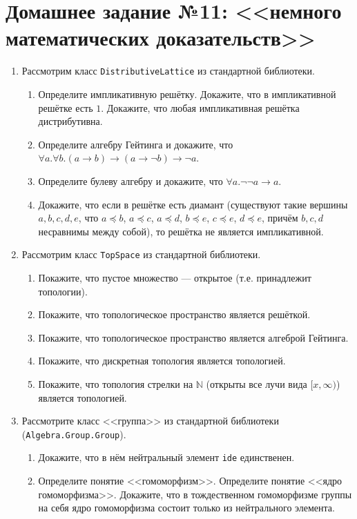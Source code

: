 \documentclass[10pt,a4paper,oneside]{article}
\begin{document}
\section*{Домашнее задание №11: <<немного математических доказательств>>}
\begin{enumerate}
\item Рассмотрим класс \verb!DistributiveLattice! из стандартной библиотеки.
\begin{enumerate}
\item Определите импликативную решётку.
Докажите, что в импликативной решётке есть $1$.
Докажите, что любая импликативная решётка дистрибутивна.
\item Определите алгебру Гейтинга и докажите, что $\forall a.\forall b.(a \rightarrow b) \rightarrow (a \rightarrow \neg b) \rightarrow \neg a$.
\item Определите булеву алгебру и докажите, что $\forall a.\neg\neg a \rightarrow a$.
\item Докажите, что если в решётке есть диамант (существуют такие вершины $a,b,c,d,e$, что $a \preceq b$, $a \preceq c$, $a \preceq d$,
$b \preceq e$, $c \preceq e$, $d \preceq e$, причём $b,c,d$ несравнимы между собой), то решётка не является импликативной.
\end{enumerate}
\item Рассмотрим класс \verb!TopSpace! из стандартной библиотеки.
\begin{enumerate}
\item Покажите, что пустое множество --- открытое (т.е. принадлежит топологии).
\item Покажите, что топологическое пространство является решёткой.
\item Покажите, что топологическое пространство является алгеброй Гейтинга.
\item Покажите, что дискретная топология является топологией.
\item Покажите, что топология стрелки на $\mathbb{N}$ (открыты все лучи вида $[x,\infty)$) является топологией.
\end{enumerate}
\item Рассмотрите класс <<группа>> из стандартной библиотеки (\verb!Algebra.Group.Group!).
\begin{enumerate}
\item Докажите, что в нём нейтральный элемент \verb!ide! единственен.
\item Определите понятие <<гомоморфизм>>. Определите понятие <<ядро гомоморфизма>>. Докажите, что 
в тождественном гомоморфизме группы на себя ядро гомоморфизма состоит только из нейтрального элемента.

\end{enumerate}
\end{enumerate}
\end{document}
